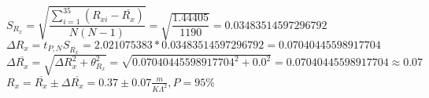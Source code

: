 $
S_{R_{x}} = 
\sqrt{
    \dfrac
    {
        \sum_{i=1}^{35}(R_{xi} - \overline{R_{x}})
    }
    {
        N(N-1)
    }
}
=
\sqrt{
    \dfrac
    {
        1.44405
    }
    {
        1190
    }
}
=
0.03483514597296792
$
\\

$ 
\varDelta R_{x} = 
t_{P,N}S_{\overline{R_{x}}} = 
2.021075383 * 0.03483514597296792 = 
0.07040445598917704
$
\\

$ 
\varDelta \overline{R_{x}} = 
\sqrt{\varDelta R_{x}^2 + \theta_{R_{x}}^2} =
\sqrt{0.07040445598917704^2 + 0.0^2} = 
0.07040445598917704 \approx 
0.07
$
\\

$ R_{x} = 
\overline{R_{x}} \pm \varDelta \overline{R_{x}} = 
0.37 \pm 0.07 \frac{m}{K\Lambda^2}, P = 95\%
$
\\

